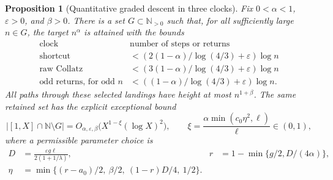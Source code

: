 \documentclass[11pt]{article}
\newtheorem{proposition}{Proposition}
\theoremstyle{remark}\newtheorem{remark}[proposition]{Remark}
\newcommand{\NN}{\mathbb N}
\begin{document}
\begin{proposition}[Quantitative graded descent in three clocks]
\label{prop:shaik-graded-quantitative}
Fix \(0<\alpha<1\), \(\varepsilon>0\), and \(\beta>0\).
There is a set \(G\subset\NN_{>0}\) such that, for all sufficiently
large \(n\in G\), the target \(n^\alpha\) is attained with the bounds
\begin{equation}\label{eq:shaik-graded-clocks}
\begin{array}{c|c}
 \text{clock} & \text{number of steps or returns}\\ \hline
 \text{shortcut} &
  <(2(1-\alpha)/\log(4/3)+\varepsilon)\log n\\
 \text{raw Collatz} &
  <(3(1-\alpha)/\log(4/3)+\varepsilon)\log n\\
 \text{odd returns, for odd }n &
  <((1-\alpha)/\log(4/3)+\varepsilon)\log n .
\end{array}
\end{equation}
All paths through these selected landings have height at most
\(n^{1+\beta}\). The same retained set has the explicit exceptional bound
\begin{equation}\label{eq:shaik-graded-rate}
 |[1,X]\cap\NN\setminus G|
   =O_{\alpha,\varepsilon,\beta}\bigl(X^{1-\xi}(\log X)^2\bigr),
 \qquad
 \xi=\frac{\alpha\min(c_0\eta^2,\ell)}{\ell}\in(0,1),
\end{equation}
where a permissible parameter choice is
\begin{align}
 D&=\frac{\varepsilon g\ell}{2(1+1/\lambda)},&
 r&=1-\min\{g/2,D/(4\alpha)\},\label{eq:shaik-graded-parameters}\\
 \eta&=\min\{(r-a_0)/2,\ \beta/2,\ (1-r)D/4,\ 1/2\}.\nonumber
\end{align}
\end{proposition}
\end{document}
